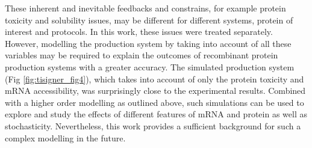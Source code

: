  These inherent and inevitable feedbacks and constrains, for example protein toxicity and solubility issues, may be different for different systems, protein of interest and protocols. In this work, these issues were treated separately. However, modelling the production system by taking into account of all these variables may be required to explain the outcomes of recombinant protein production systems with a greater accuracy. The simulated production system (Fig \ref{fig:tisigner_fig4}), which takes into account of only the protein toxicity and mRNA accessibility, was surprisingly close to the experimental results. Combined with a higher order modelling as outlined above, such simulations can be used to explore and study the effects of different features of mRNA and protein as well as stochasticity. Nevertheless, this work provides a sufficient background for such a complex modelling in the future.
 
 
 
   


